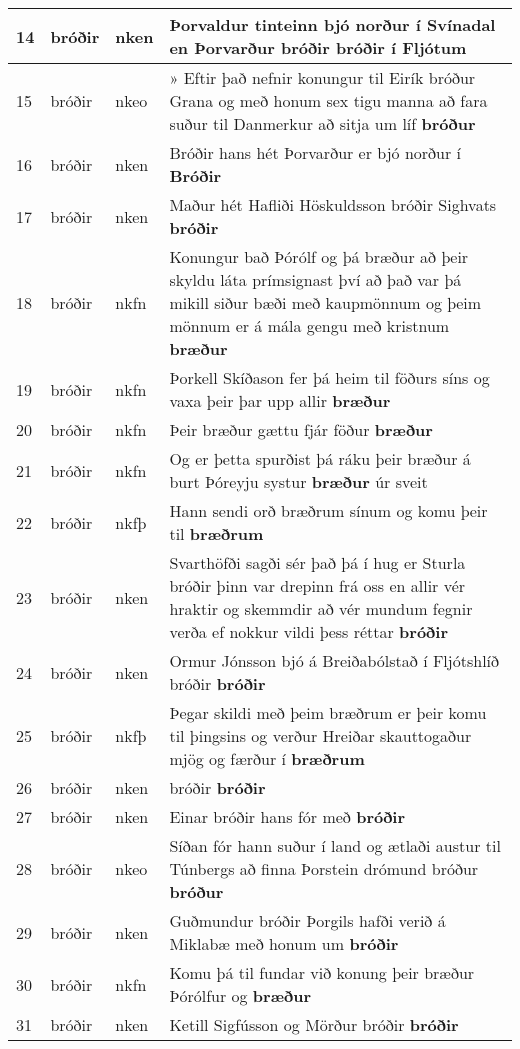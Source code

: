 \documentclass{article}
\begin{document}
\begin{longtable}{p{1cm}|p{1cm}|p{1cm}|p{13cm}}
14&bróðir&nken&Þorvaldur tinteinn bjó norður í Svínadal en Þorvarður bróðir \textbf{bróðir} í Fljótum\\
\hline
15&bróðir&nkeo&» Eftir það nefnir konungur til Eirík bróður Grana og með honum sex tigu manna að fara suður til Danmerkur að sitja um líf \textbf{bróður} \\
\hline
16&bróðir&nken&Bróðir hans hét Þorvarður er bjó norður í \textbf{Bróðir} \\
\hline
17&bróðir&nken&Maður hét Hafliði Höskuldsson bróðir Sighvats \textbf{bróðir} \\
\hline
18&bróðir&nkfn&Konungur bað Þórólf og þá bræður að þeir skyldu láta prímsignast því að það var þá mikill siður bæði með kaupmönnum og þeim mönnum er á mála gengu með kristnum \textbf{bræður} \\
\hline
19&bróðir&nkfn&Þorkell Skíðason fer þá heim til föðurs síns og vaxa þeir þar upp allir \textbf{bræður} \\
\hline
20&bróðir&nkfn&Þeir bræður gættu fjár föður \textbf{bræður} \\
\hline
21&bróðir&nkfn&Og er þetta spurðist þá ráku þeir bræður á burt Þóreyju systur \textbf{bræður} úr sveit\\
\hline
22&bróðir&nkfþ&Hann sendi orð bræðrum sínum og komu þeir til \textbf{bræðrum} \\
\hline
23&bróðir&nken&Svarthöfði sagði sér það þá í hug er Sturla bróðir þinn var drepinn frá oss en allir vér hraktir og skemmdir að vér mundum fegnir verða ef nokkur vildi þess réttar \textbf{bróðir} \\
\hline
24&bróðir&nken&Ormur Jónsson bjó á Breiðabólstað í Fljótshlíð bróðir \textbf{bróðir} \\
\hline
25&bróðir&nkfþ&Þegar skildi með þeim bræðrum er þeir komu til þingsins og verður Hreiðar skauttogaður mjög og færður í \textbf{bræðrum} \\
\hline
26&bróðir&nken&bróðir \textbf{bróðir} \\
\hline
27&bróðir&nken&Einar bróðir hans fór með \textbf{bróðir} \\
\hline
28&bróðir&nkeo&Síðan fór hann suður í land og ætlaði austur til Túnbergs að finna Þorstein drómund bróður \textbf{bróður} \\
\hline
29&bróðir&nken&Guðmundur bróðir Þorgils hafði verið á Miklabæ með honum um \textbf{bróðir} \\
\hline
30&bróðir&nkfn&Komu þá til fundar við konung þeir bræður Þórólfur og \textbf{bræður} \\
\hline
31&bróðir&nken&Ketill Sigfússon og Mörður bróðir \textbf{bróðir} \\

\end{longtable}
\end{document}
